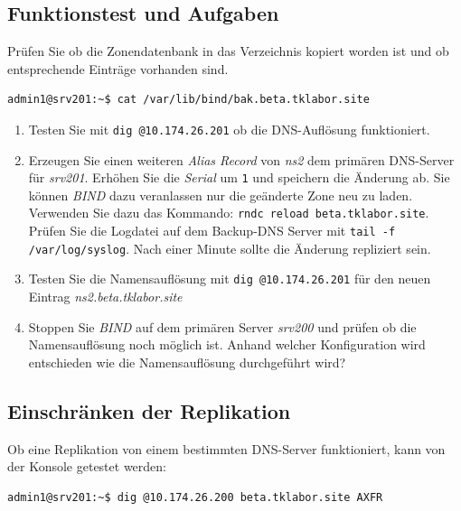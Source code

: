 \subsection{Funktionstest und Aufgaben}
Prüfen Sie ob die Zonendatenbank in das Verzeichnis kopiert worden ist und ob
entsprechende Einträge vorhanden sind.

\begin{lstlisting}
admin1@srv201:~$ cat /var/lib/bind/bak.beta.tklabor.site
\end{lstlisting}

\begin{enumerate}
  \item Testen Sie mit \texttt{dig @10.174.26.201} ob die DNS-Auflösung
  funktioniert.
  \item Erzeugen Sie einen weiteren \textit{Alias Record} von \textit{ns2} dem
  primären DNS-Server für \textit{srv201}. Erhöhen Sie die \textit{Serial} um
  \texttt{1} und speichern die Änderung ab. Sie können \textit{BIND} dazu
  veranlassen nur die geänderte Zone neu zu laden. Verwenden Sie dazu das
  Kommando: \texttt{rndc reload beta.tklabor.site}. Prüfen Sie die Logdatei auf
  dem Backup-DNS Server mit \texttt{tail -f /var/log/syslog}. Nach einer Minute
  sollte die Änderung repliziert sein.
  \item Testen Sie die Namensauflösung mit \texttt{dig @10.174.26.201} für den
  neuen Eintrag \textit{ns2.beta.tklabor.site}
  \item Stoppen Sie \textit{BIND} auf dem primären Server \textit{srv200} und
  prüfen ob die Namensauflösung noch möglich ist. Anhand welcher Konfiguration
  wird entschieden wie die Namensauflösung durchgeführt wird?
\end{enumerate}

\subsection{Einschränken der Replikation}
Ob eine Replikation von einem bestimmten DNS-Server funktioniert, kann von der
Konsole getestet werden:

\begin{lstlisting}
admin1@srv201:~$ dig @10.174.26.200 beta.tklabor.site AXFR
\end{lstlisting}

